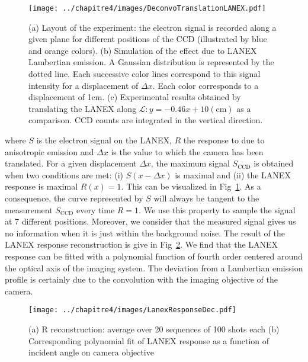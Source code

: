 \begin{figure}[H]
\centering
\texttt{[image: ../chapitre4/images/DeconvoTranslationLANEX.pdf]}\\
\caption{\label{fig:DeconvoTranslationLANEX} (a) Layout of the experiment: the electron signal is recorded along a given plane for different positions of the CCD (illustrated by blue and orange colors). (b) Simulation of the effect due to LANEX Lambertian emission. A Gaussian distribution is represented by the dotted line. Each successive color lines correspond to this signal intensity for a displacement of $\Delta x$. Each color corresponds to a displacement of 1cm. (c) Experimental results obtained by translating the LANEX along $\mathcal{L}: y = -0.46 x + 10\mathrm{(cm)}$ as a comparison. CCD counts are integrated in the vertical direction.}
\end{figure}



\noindent where $S$ is the electron signal on the LANEX, $R$ the response to due to anisotropic emission and $\Delta x$ is the value to which the camera has been translated. For a given displacement $\Delta x$, the maximum signal $S_{\text{CCD}}$ is obtained when two conditions are met: (i) $S(x-\Delta x)$ is maximal and (ii) the LANEX response is maximal $R(x) = 1$.
This can be visualized in Fig~\ref{fig:DeconvoTranslationLANEX}. As a consequence, the curve represented by $S$ will always be tangent to the measurement $S_{\text{CCD}}$ every time $R = 1$. We use this property to sample the signal at 7 different positions. Moreover, we consider that the measured signal gives us no information when it is just within the background noise. The result of the LANEX response reconstruction is give in Fig~\ref{fig:DeconvoLANEX-fit}. We find that the LANEX response can be fitted with a polynomial function of fourth order centered around the optical axis of the imaging system. The deviation from a Lambertian emission profile is certainly due to the convolution with the imaging objective of the camera.\\



%
%



\begin{figure}[H]
\centering
\texttt{[image: ../chapitre4/images/LanexResponseDec.pdf]}\\
\caption{\label{fig:DeconvoLANEX-fit} (a) R reconstruction: average over 20 sequences of 100 shots each (b) Corresponding polynomial fit of LANEX response as a function of incident angle on camera objective} %
\end{figure}

